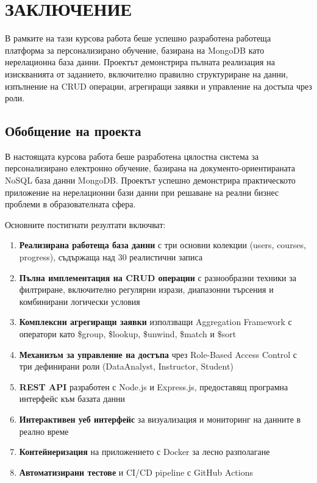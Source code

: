 
\section{ЗАКЛЮЧЕНИЕ}

В рамките на тази курсова работа беше успешно разработена работеща платформа за персонализирано обучение, базирана на MongoDB като нерелационна база данни. Проектът демонстрира пълната реализация на изискванията от заданието, включително правилно структуриране на данни, изпълнение на CRUD операции, агрегиращи заявки и управление на достъпа чрез роли.

\subsection{Обобщение на проекта}

В настоящата курсова работа беше разработена цялостна система за персонализирано електронно обучение, базирана на документо-ориентираната NoSQL база данни MongoDB. Проектът успешно демонстрира практическото приложение на нерелационни бази данни при решаване на реални бизнес проблеми в образователната сфера.

Основните постигнати резултати включват:

\begin{enumerate}
    \item \textbf{Реализирана работеща база данни} с три основни колекции (users, courses, progress), съдържаща над 30 реалистични записа
    \item \textbf{Пълна имплементация на CRUD операции} с разнообразни техники за филтриране, включително регулярни изрази, диапазонни търсения и комбинирани логически условия
    \item \textbf{Комплексни агрегиращи заявки} използващи Aggregation Framework с оператори като \$group, \$lookup, \$unwind, \$match и \$sort
    \item \textbf{Механизъм за управление на достъпа} чрез Role-Based Access Control с три дефинирани роли (DataAnalyst, Instructor, Student)
    \item \textbf{REST API} разработен с Node.js и Express.js, предоставящ програмна интерфейс към базата данни
    \item \textbf{Интерактивен уеб интерфейс} за визуализация и мониторинг на данните в реално време
    \item \textbf{Контейнеризация} на приложението с Docker за лесно разполагане
    \item \textbf{Автоматизирани тестове} и CI/CD pipeline с GitHub Actions
\end{enumerate}

